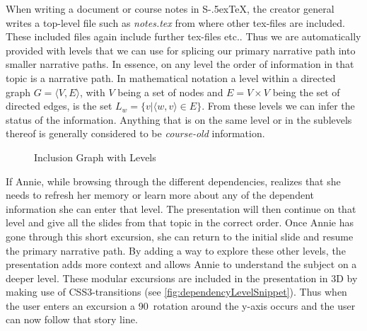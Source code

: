 \documentclass[twoside, 12pt]{article}
\def\stex{\texorpdfstring{\raisebox{-.5ex}S\kern-.5ex\TeX}{sTeX}\xspace}
\begin{document}
When writing a document or course notes in \stex, the creator general writes a top-level file such as \textit{notes.tex} from where other tex-files are included. These included files again include further tex-files etc.. Thus we are automatically provided with levels that we can use for splicing our primary narrative path into smaller narrative paths. In essence, on any level the order of information in that topic is a narrative path. In mathematical notation a level within a directed graph $G = \langle V, E \rangle $, with $V$ being a set of nodes and $E = V \times V$ being the set of directed edges, is the set $L_w = \lbrace v \vert \langle w, v \rangle \in E \rbrace$. From these levels we can infer the status of the information. Anything that is on the same level or in the sublevels thereof is generally considered to be \textit{course-old} information.\\

\begin{figure}
\vspace{-26pt}
  \begin{center}
\vspace{-5pt}
  \caption{Inclusion Graph with Levels}
  \label{fig:levelsGraph}
\vspace{12pt}
  \end{center}
\end{figure}

\begin{figure}
\vspace{-50pt}
\end{figure}

If Annie, while browsing through the different dependencies, realizes that she needs to refresh her memory or learn more about any of the dependent information she can enter that level. The presentation will then continue on that level and give all the slides from that topic in the correct order. Once Annie has gone through this short excursion, she can return to the initial slide and resume the primary narrative path. By adding a way to explore these other levels, the presentation adds more context and allows Annie to understand the subject on a deeper level. These modular excursions are included in the presentation in 3D by making use of CSS3-transitions (see \autoref{fig:dependencyLevelSnippet}). Thus when the user enters an excursion a 90\degree\ rotation around the y-axis occurs and the user can now follow that story line.\\
\end{document}
